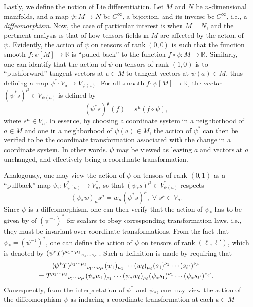 \documentclass[
12pt,		%
openright,	%
twoside,  %
a4paper,			%
chapter=TITLE,		%
english,			%
french,				%
spanish,			%
brazil				%
]{USPSC-classe/USPSC}
\begin{document}
\begin{apendicesenv}
Lastly, we define the notion of Lie differentiation. Let $M$ and $N$ be $n$-dimensional manifolds, and a map $\psi:M\to N$ be $C^{\infty}$, a bijection, and its inverse be $C^{\infty}$, i.e., a \textit{diffeomorphism}. Now, the case of particular interest is when $M=N$, and the pertinent analysis is that of how tensors fields in $M$ are affected by the action of $\psi$. Evidently, the action of $\psi$ on tensors of rank $(0,0)$ is such that the function smooth $f:\psi[M]\to\mathbb{R}$ is “pulled back” to the function $f\circ\psi:M\to\mathbb{R}$. Similarly, one can identify that the action of $\psi$ on tensors of rank $(1,0)$ is to ``pushforward'' tangent vectors at $a\in M$ to tangent vectors at $\psi(a)\in M$, thus defining a map $\psi^*:V_a\to V_{\psi(a)}$. For all smooth $f:\psi[M]\to \mathbb{R}$, the vector $(\psi^*s)^{\mu}\in V_{\psi(a)}$ is defined by 
\begin{equation}
    (\psi^*s)^{\mu}(f)=s^{\mu}(f\circ\psi),
\end{equation}
where $s^{\mu}\in V_a$. In essence, by choosing a coordinate system in a neighborhood of $a\in M$ and one in a neighborhood of $\psi(a)\in M$, the action of $\psi^*$ can then be verified to be the coordinate transformation associated with the change in a coordinate system. In other words, $\psi$ may be viewed as leaving $a$ and vectors at $a$ unchanged, and effectively being a coordinate transformation.

Analogously, one may view the action of $\psi$ on tensors of rank $(0,1)$ as a ``pullback'' map $\psi_*:V^*_{\psi(a)}\to V^*_a$, so that $(\psi_*s)^{\mu}\in V^*_{\psi(a)}$ respects
\begin{equation}
    (\psi_*w)_{\mu}s^{\mu}=w_{\mu}(\psi^*s)^{\mu},\;\forall\;s^{\mu}\in V_a.
\end{equation}
Since $\psi$ is a diffeomorphism, one can then verify that the action of $\psi_*$ has to be given by of $(\psi^{-1})^*$ for scalars to obey corresponding transformation laws, i.e., they must be invariant over coordinate transformations. From the fact that $\psi_*=(\psi^{-1})^*$, one can define the action of $\psi$ on tensors of rank $(\ell,\ell')$, which is denoted by $(\psi^*T)^{\mu_1\cdots\mu_{\ell}}\mathstrut_{\nu_1\cdots\nu_{\ell'}}$. Such a definition is made by requiring that 
\begin{multline}
    (\psi^*T)^{\mu_1\cdots\mu_{\ell}}\mathstrut_{\nu_1\cdots\nu_{\ell'}}(w_1)_{\mu_1}\cdots(w_{\ell})_{\mu_{\ell}}(s_1)^{\nu_1}\cdots(s_{\ell'})^{\nu_{\ell'}}\\=T^{\mu_1\cdots\mu_{\ell}}\mathstrut_{\nu_1\cdots\nu_{\ell'}}(\psi_*w_1)_{\mu_1}\cdots(\psi_*w_{\ell})_{\mu_{\ell}}(\psi_*s_1)^{\nu_1}\cdots(\psi_*s_{\ell'})^{\nu_{\ell'}}.
    \end{multline}
Consequently, from the interpretation of $\psi^*$ and $\psi_*$, one may view the action of the diffeomorphism $\psi$ as inducing a coordinate transformation at each $a\in M$.


\end{apendicesenv}
\end{document}
